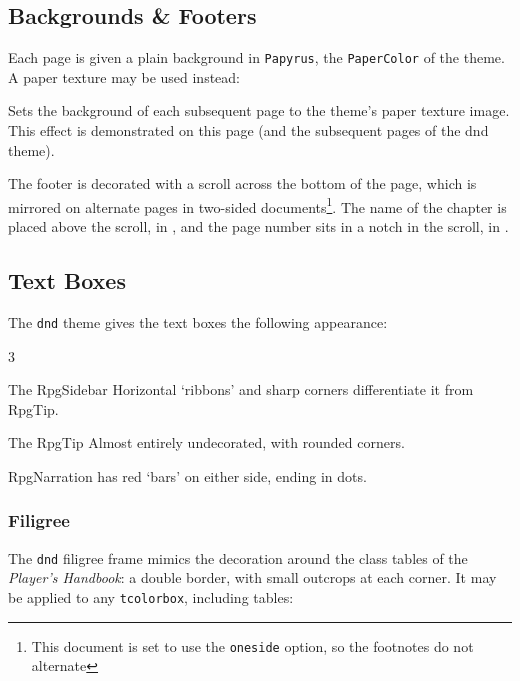 		\subsection{Backgrounds \& Footers}

			Each page is given a plain background in \texttt{Papyrus}, the \texttt{PaperColor} of the theme. A paper texture may be used instead:

			{
				Sets the background of each subsequent page to the theme's paper texture image.
			}
			This effect is demonstrated on this page (and the subsequent pages of the dnd theme).
			\RpgSetDndPaper{}

			The footer is decorated with a scroll across the bottom of the page, which is mirrored on alternate pages in two-sided documents\footnote{This document is set to use the \texttt{oneside} option, so the footnotes do not alternate}. The name of the chapter is placed above the scroll, in , and the page number sits in a notch in the scroll, in .

		\subsection{Text Boxes}

			The \texttt{dnd} theme gives the text boxes the following appearance:

			\begin{multicols}{3}

				\begin{RpgSidebar}{The RpgSidebar}
					Horizontal `ribbons' and sharp corners differentiate it from RpgTip.
				\end{RpgSidebar}

				\begin{RpgTip}{The RpgTip}
					Almost entirely undecorated, with rounded corners.
				\end{RpgTip}

				\begin{RpgNarration}
					RpgNarration has red `bars' on either side, ending in dots.
				\end{RpgNarration}
			\end{multicols}
			\subsubsection{Filigree}\label{S:DndFiligree}

				The \texttt{dnd} filigree frame  mimics the decoration around the class tables of the \textit{Player's Handbook}: a double border, with small outcrops at each corner. It may be applied to any \texttt{tcolorbox}, including tables:

